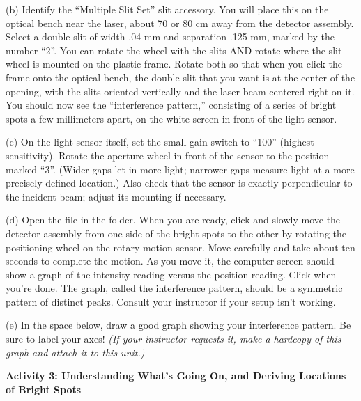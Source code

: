 
(b) Identify the ``Multiple Slit Set'' slit accessory.  You will place this on the optical bench near the laser, about 70 or 80 cm away from the detector assembly.  Select a double slit of width .04 mm and separation .125 mm, marked by the number ``2''. You can rotate the wheel with the slits AND rotate where the slit wheel is mounted on the plastic frame.  
Rotate both so that when you click the frame onto the optical bench, the double slit that you want is at the center of the opening, with the slits oriented vertically and the laser beam centered right on it.  You should now see the ``interference pattern,'' consisting of a series of bright spots a few millimeters apart, on the white screen in front of the light sensor.


(c) On the light sensor itself, set the small gain switch to ``100'' (highest sensitivity).  Rotate the aperture wheel in front of the sensor to the position marked ``3''.  (Wider gaps let in more light; narrower gaps measure light at a more precisely defined location.)  Also check that the sensor is exactly perpendicular to the incident beam; adjust its mounting if necessary.


(d) Open the file  in the \filename{\coursefolder} folder. 
When you are ready, click  and slowly move the detector assembly 
from one side of the bright spots to the other by rotating the positioning wheel on the rotary 
motion sensor. Move carefully and take about ten seconds to complete the 
motion. 
As you move it, the computer screen should show a graph of the intensity reading versus the position reading. 
Click  when you're done. 
The graph, called the interference pattern, should be a symmetric pattern of distinct peaks. Consult your instructor if your setup isn't working.

(e) In the space below, draw a good graph showing your interference pattern.  
Be sure to label your axes!
\textit{(If your instructor requests it, make a hardcopy of this graph and attach it to this unit.)}

\answerspace{1.0in}


\pagebreak[2]
\textbf{Activity 3: Understanding What's Going On, and Deriving Locations of Bright Spots}

